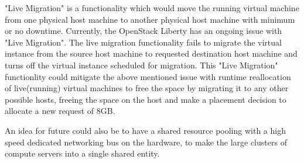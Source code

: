 "Live Migration" is a functionality which would move the running virtual machine from one physical host machine to another physical host machine with minimum or no downtime.
Currently, the OpenStack Liberty has an ongoing issue with "Live Migration".
The live migration functionality fails to migrate the virtual instance from the source host machine to requested destination host machine and turns off the virtual instance scheduled for migration.
This "Live Migration" functionlity could mitigate the above mentioned issue with runtime reallocation of live(running) virtual machines to free the space by migrating it to any other possible hosts, freeing the space on the host and make a placement decision to allocate a new request of 8GB.

An idea for future could also be to have a shared resource pooling with a high speed dedicated networking bus on the hardware, to make the large clusters of compute servers into a single shared entity.